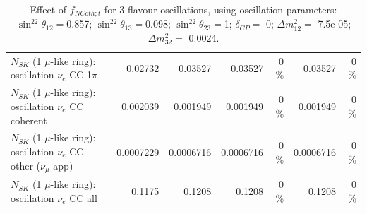 \begin{table}
\begin{tabular}{| l | r | r | r  r | r  r |}
                     $N_{SK}$ (1 $\mu$-like ring): oscillation $\nu_e$ CC 1$\pi$ &         0.02732 &         0.03527 &         0.03527 &        0 \%  &         0.03527 &        0 \%  \\ 
                   $N_{SK}$ (1 $\mu$-like ring): oscillation $\nu_e$ CC coherent &        0.002039 &        0.001949 &        0.001949 &        0 \%  &        0.001949 &        0 \%  \\ 
      $N_{SK}$ (1 $\mu$-like ring): oscillation $\nu_e$ CC other ($\nu_\mu$ app) &       0.0007229 &       0.0006716 &       0.0006716 &        0 \%  &       0.0006716 &        0 \%  \\ 
                       $N_{SK}$ (1 $\mu$-like ring): oscillation $\nu_e$  CC all &          0.1175 &          0.1208 &          0.1208 &        0 \%  &          0.1208 &        0 \%  \\ 
\hline
\hline
\end{tabular}
\caption{ Effect of $f_{NCoth; t}$ for 3 flavour oscillations, using oscillation parameters:  $\sin^22\theta_{12} = $0.857; $\sin^22\theta_{13} = $0.098; $\sin^22\theta_{23} = $1; $\delta_{CP} = $        0; $\Delta m^2_{12} = $    7.5e-05; $\Delta m^2_{32} = $    0.0024. }
\label{tab:num_xsec_norm_ncoth_1RmuT_3f_osc_t13:0.098}
\end{table}
\clearpage
